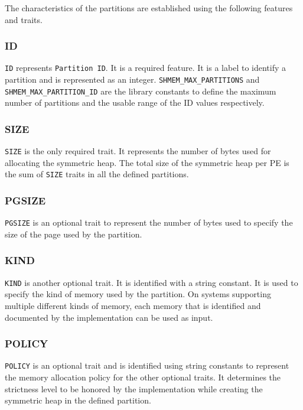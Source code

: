The characteristics of the partitions are established using the
following features and traits.

\subsubsection{ID} \texttt{ID} represents \texttt{Partition ID}.
It is a required
feature. It is a label to identify a partition and is represented
as an integer. \texttt{SHMEM\_MAX\_PARTITIONS} and
\texttt{SHMEM\_MAX\_PARTITION\_ID} are the library constants to
define the maximum number of partitions and the usable range of
the ID values respectively.

\subsubsection{SIZE} \texttt{SIZE} is the only required trait. It
represents the number of bytes used for allocating the symmetric
heap. The total size of the symmetric heap per PE is %
the sum of \texttt{SIZE} traits in all the defined partitions.

\subsubsection{PGSIZE} \texttt{PGSIZE} is an optional trait to
represent the number of bytes used to specify the size of the
page used by the partition.

\subsubsection{KIND} \texttt{KIND} is another optional trait.
It is identified with a string constant. It is used to specify
the kind of memory used by the partition. On systems supporting
multiple different kinds of memory, each memory that is identified
and documented by the implementation can be used as input.

\subsubsection{POLICY} \texttt{POLICY} is an optional trait and
is identified using string constants to represent the memory
allocation policy for the other optional traits. It determines
the strictness level to be honored by the implementation while
creating the symmetric heap in the defined partition.

